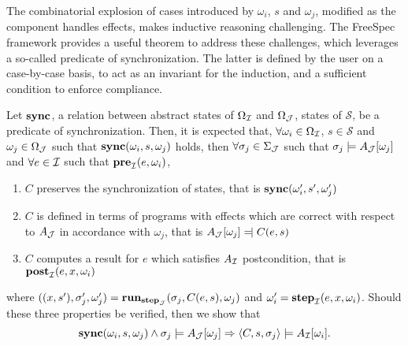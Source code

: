 The combinatorial explosion of cases introduced by $\omega_i$, $s$ and
$\omega_j$, modified as the component handles effects, makes inductive
reasoning challenging.
%
The FreeSpec framework provides a useful theorem to address these challenges,
which leverages a so-called predicate of synchronization.
%
The latter is defined by the user on a case-by-case basis, to act as an
invariant for the induction, and a sufficient condition to enforce compliance.

\begin{theorem} \label{theorem:der-compliance}
  Let $\mathbf{\mathbf{sync}}$, a relation between abstract states of $\Omega_{\mathcal{I}}$ and
  $\Omega_{\mathcal{J}}$, states of $\mathcal{S}$, be a predicate of
  synchronization.
  Then, it is expected that, $\forall \omega_i \in \Omega_{\mathcal{I}}$, $s \in
  \mathcal{S}$ and $\omega_j \in \Omega_{\mathcal{J}}$ such that
  $\mathbf{\mathbf{sync}}(\omega_i, s, \omega_j)$ holds, then $\forall \sigma_j \in
  \Sigma_{\mathcal{J}}$ such that $\sigma_j \models A_{\mathcal{J}}[\omega_j]$
  and $\forall e \in \mathcal{I}$ such that $\mathbf{\mathbf{pre}}_{\mathcal{I}}(e, \omega_i)$,
  \begin{enumerate}
  \item $C$ preserves the synchronization of states, that is
    $\mathbf{\mathbf{sync}}(\omega_i', s', \omega_j')$
  \item $C$ is defined in terms of programs with effects which are correct with
    respect to $A_{\mathcal{J}}$ in accordance with $\omega_j$, that is
    $A_{\J}[\omega_j] \modelssym C(e, s)$
  \item $C$ computes a result for $e$ which satisfies $A_{\mathcal{I}}$ postcondition,
     that is $\mathbf{\mathbf{post}}_{\mathcal{I}}(e, x, \omega_i)$
  \end{enumerate}
  where
  $((x, s'), \sigma_j', \omega_j') = \mathbf{\mathbf{run}}_{\mathbf{\mathbf{step}}_{\mathcal{J}}}(\sigma_j,
  C(e, s), \omega_j)$ and
  $\omega_i' = \mathbf{\mathbf{step}}_{\mathcal{I}}(e, x, \omega_i)$.
  Should these three properties be verified, then we show that
  \[ \mathbf{\mathbf{sync}}(\omega_i, s, \omega_j) \wedge \sigma_j \models
    A_{\mathcal{J}}[\omega_j] \Rightarrow \langle C, s, \sigma_j \rangle \models
    A_{\mathcal{I}}[\omega_i].
  \]
\end{theorem}

